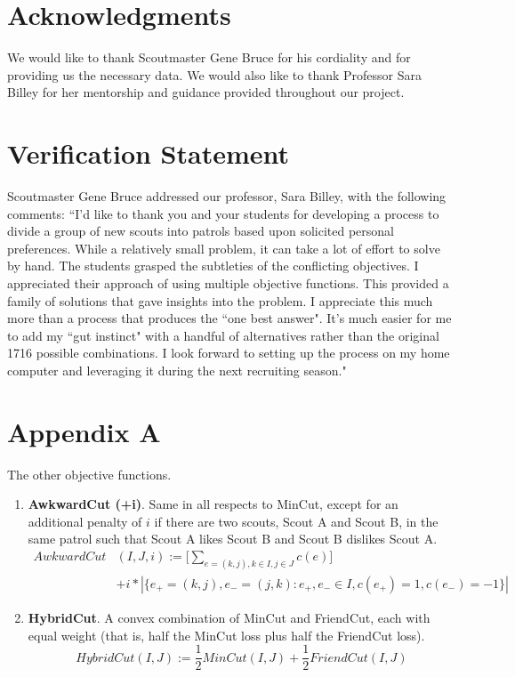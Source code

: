 \documentclass{amsart}
\theoremstyle{definition}
\theoremstyle{remark}
\numberwithin{equation}{section}
\begin{document}
\section*{Acknowledgments}
We would like to thank Scoutmaster Gene Bruce for his cordiality and for providing us the necessary data. We would also like to thank Professor Sara Billey for her mentorship and guidance provided throughout our project. 

\section*{Verification Statement}
Scoutmaster Gene Bruce addressed our professor, Sara Billey, with the following comments: ``I'd like to thank you and your students for developing a process to divide a group of new scouts into patrols based upon solicited personal preferences.  While a relatively small problem, it can take a lot of effort to solve by hand.  The students grasped the subtleties of the conflicting objectives.  I appreciated their approach of using multiple objective functions.  This provided a family of solutions that gave insights into the problem.  I appreciate this much more than a process that produces the ``one best answer".  It's much easier for me to add my ``gut instinct" with a handful of alternatives rather than the original 1716 possible combinations.  I look forward to setting up the process on my home computer and leveraging it during the next recruiting season."
\section*{Appendix A}
The other objective functions.

\begin{enumerate}
    \item \textbf{AwkwardCut (+i)}. Same in all respects to MinCut, except for an additional penalty of $i$ if there are two scouts, Scout A and Scout B, in the same patrol such that Scout A likes Scout B and Scout B dislikes Scout A.
    \begin{equation*}
        \begin{split}
            AwkwardCut&(I, J, i) := \Bigg[ \sum_{e = (k, j), k \in I, j \in J}^{} c(e) \Bigg] \\
            &+ i * \left\vert{\{e_+ = (k,j), e_- = (j, k) : e_+, e_- \in I, c(e_+) = 1, c(e_-) = -1\}}\right\vert
        \end{split}
    \end{equation*}

\item \textbf{HybridCut}. A convex combination of MinCut and FriendCut, each with equal weight (that is, half the MinCut loss plus half the FriendCut loss).
    \begin{equation*}
        HybridCut(I, J) := \frac{1}{2}MinCut(I, J) + \frac{1}{2}FriendCut(I, J)
    \end{equation*}
\end{enumerate}
\end{document}
